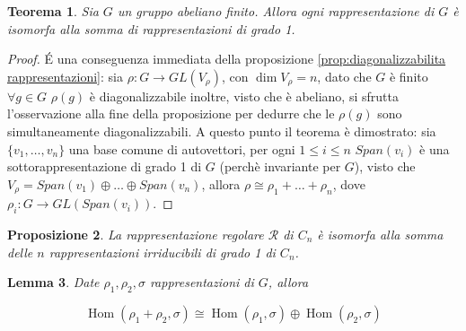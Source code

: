 \documentclass[11pt]{article}
\theoremstyle{plain}
\newtheorem{thm}{Teorema}[section]
\newtheorem{lemma}[thm]{Lemma}
\newtheorem{prop}[thm]{Proposizione}
\theoremstyle{definition}
\theoremstyle{remark}
\DeclareMathOperator{\Hom}{Hom}
\begin{document}
\begin{thm}Sia $G$ un gruppo abeliano finito. Allora ogni rappresentazione di $G$ è isomorfa alla somma di rappresentazioni di grado 1.
\end{thm}
\begin{proof}
	\'E una conseguenza immediata della proposizione \eqref{prop:diagonalizzabilita rappresentazioni}: sia $\rho:G\to GL(V_{\rho})$, con $\dim V_{\rho} = n$, dato che $G$ è finito $\forall g\in G$ $\rho(g)$ è diagonalizzabile inoltre, visto che è abeliano, si sfrutta l'osservazione alla fine della proposizione per dedurre che le $\rho(g)$ sono simultaneamente diagonalizzabili. A questo punto il teorema è dimostrato: sia $\{v_1,\ldots,v_n\}$ una base comune di autovettori, per ogni $1\leq i\leq n$ $Span(v_i)$ è una sottorappresentazione di grado 1 di $G$ (perchè invariante per $G$), visto che $V_{\rho}=Span(v_1)\oplus\ldots\oplus Span(v_n)$, allora $\rho\cong\rho_1+\ldots+\rho_n$, dove $\rho_i:G\to GL(Span(v_i))$.
\end{proof}


\begin{prop} La rappresentazione regolare $\mathcal{R}$ di $C_n$ è isomorfa alla somma delle $n$ rappresentazioni irriducibili di grado 1 di $C_n$.

\end{prop}


\begin{lemma}
Date $\rho_1, \rho_2, \sigma$ rappresentazioni di $G$, allora

\[\Hom(\rho_1 + \rho_2, \sigma) \cong \Hom(\rho_1, \sigma) \oplus \Hom(\rho_2, \sigma)\]

\end{lemma}
\end{document}
